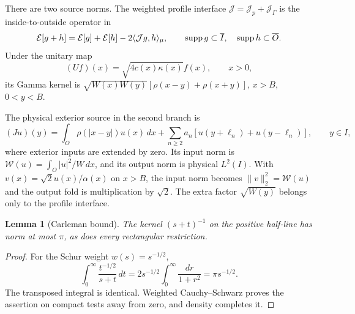 \documentclass[11pt,a4paper]{article}
\numberwithin{equation}{section}
\newtheorem{lemma}[theorem]{Lemma}
\theoremstyle{remark}\newtheorem{remark}[theorem]{Remark}
\newcommand{\E}{\mathcal E}\newcommand{\D}{\mathcal D}
\newcommand{\norm}[1]{\lVert#1\rVert}\newcommand{\abs}[1]{\lvert#1\rvert}
\newcommand{\ip}[2]{\langle#1,#2\rangle}\newcommand{\dd}{\mathop{}\!\mathrm d}
\newcommand{\wo}{\mathcal W}\newcommand{\HS}{\mathrm{HS}}
\begin{document}
There are two source norms. The weighted profile interface $\mathcal J=\mathcal J_p+\mathcal J_\Gamma$ is the inside-to-outside operator in
\begin{equation}\label{eq:energycross}
 \E[g+h]=\E[g]+\E[h]-2\ip{\mathcal Jg}{h}_\mu,
 \qquad \supp g\subset\overline I,\quad\supp h\subset\overline O.
\end{equation}
Under the unitary map
\begin{equation}\label{eq:foldU}
 (Uf)(x)=\sqrt{4c(x)\kappa(x)}f(x),\qquad x>0,
\end{equation}
its Gamma kernel is $\sqrt{W(x)W(y)}[\rho(x-y)+\rho(x+y)]$, $x>B$, $0<y<B$.

The physical exterior source in the second branch is
\begin{equation}\label{eq:physicalsource}
 (Ju)(y)=\int_O\rho(|x-y|)u(x)\,dx+
 \sum_{n\ge2}a_n[u(y+\ell_n)+u(y-\ell_n)],\qquad y\in I,
\end{equation}
where exterior inputs are extended by zero. Its input norm is
$\wo(u)=\int_O|u|^2/W\,dx$, and its output norm is physical $L^2(I)$.
With $v(x)=\sqrt2u(x)/\alpha(x)$ on $x>B$, the input norm becomes $\norm v_2^2=\wo(u)$ and the output fold is multiplication by $\sqrt2$. The extra factor $\sqrt{W(y)}$ belongs only to the profile interface.

\begin{lemma}[Carleman bound]\label{lem:carleman}
The kernel $(s+t)^{-1}$ on the positive half-line has norm at most $\pi$, as does every rectangular restriction.
\end{lemma}
\begin{proof}
For the Schur weight $w(s)=s^{-1/2}$,
\[
 \int_0^\infty\frac{t^{-1/2}}{s+t}\,dt
 =2s^{-1/2}\int_0^\infty\frac{dr}{1+r^2}=\pi s^{-1/2}.
\]
The transposed integral is identical. Weighted Cauchy--Schwarz proves the assertion on compact tests away from zero, and density completes it.
\end{proof}
\end{document}
